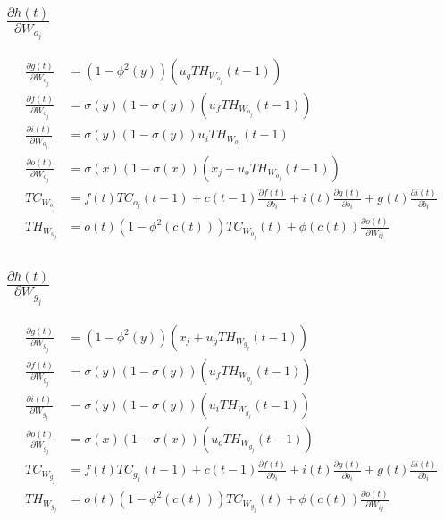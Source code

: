 \documentclass[twoside,11pt]{article}
\begin{document}
\subsection{$\frac{\partial h(t)}{\partial W_{o_j}}$}

\begin{equation}
\begin{aligned}
\frac{\partial g(t)}{\partial W_{o_j}} &=  (1-\phi^2(y))(u_g TH_{W_{o_j}}(t-1))  \\
\frac{\partial f(t)}{\partial W_{o_j}} &=  \sigma(y)(1-\sigma(y))( u_f TH_{W_{o_j}}(t-1)) \\
\frac{\partial i(t)}{\partial W_{o_j}}  &= \sigma(y)(1-\sigma(y)) u_i TH_{W_{o_j}}(t-1)  \\
\frac{\partial o(t)}{\partial W_{o_j}} &=  \sigma(x)(1-\sigma(x))(x_j + u_o TH_{W_{o_j}}(t-1))  \\
TC_{W_{o_j}}&= f(t) TC_{o_j}(t-1) + c(t-1)\frac{\partial f(t)}{ \partial b_i} + i(t)\frac{\partial g(t) }{\partial b_i}  + g(t)\frac{\partial i(t) }{\partial b_i}  \\
TH_{W_{o_j}}&= o(t) (1-\phi^{2}(c(t))) TC_{W_{o_j}}(t)  + \phi(c(t)) \frac{\partial o(t)}{\partial W_{ij}}  
\end{aligned}
\end{equation}


\subsection{$\frac{\partial h(t)}{\partial W_{g_j}}$}

\begin{equation}
\begin{aligned}
\frac{\partial g(t)}{\partial W_{g_j}} &=  (1-\phi^2(y))(x_j + u_g TH_{W_{g_j}}(t-1))  \\
\frac{\partial f(t)}{\partial W_{g_j}} &=  \sigma(y)(1-\sigma(y))( u_f TH_{W_{g_j}}(t-1)) \\
\frac{\partial i(t)}{\partial W_{g_j}}  &= \sigma(y)(1-\sigma(y))(u_i TH_{W_{g_j}}(t-1))  \\
\frac{\partial o(t)}{\partial W_{g_j}} &=  \sigma(x)(1-\sigma(x))( u_o TH_{W_{g_j}}(t-1))  \\
TC_{W_{g_j}}&= f(t) TC_{g_j}(t-1) + c(t-1)\frac{\partial f(t)}{ \partial b_i} + i(t)\frac{\partial g(t) }{\partial b_i}  + g(t)\frac{\partial i(t) }{\partial b_i}  \\
TH_{W_{g_j}}&= o(t) (1-\phi^{2}(c(t))) TC_{W_{g_j}}(t)  + \phi(c(t)) \frac{\partial o(t)}{\partial W_{ij}}  
\end{aligned}
\end{equation}
\end{document}

